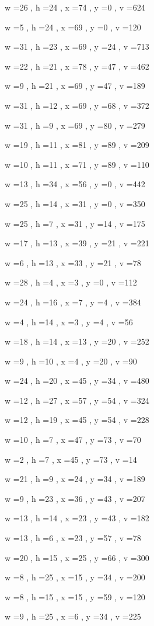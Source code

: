 \documentclass[11pt]{article}
\begin{document}
w =26 , h =24 , x =74 , y =0 , v =624
\par
w =5 , h =24 , x =69 , y =0 , v =120
\par
w =31 , h =23 , x =69 , y =24 , v =713
\par
w =22 , h =21 , x =78 , y =47 , v =462
\par
w =9 , h =21 , x =69 , y =47 , v =189
\par
w =31 , h =12 , x =69 , y =68 , v =372
\par
w =31 , h =9 , x =69 , y =80 , v =279
\par
w =19 , h =11 , x =81 , y =89 , v =209
\par
w =10 , h =11 , x =71 , y =89 , v =110
\par
w =13 , h =34 , x =56 , y =0 , v =442
\par
w =25 , h =14 , x =31 , y =0 , v =350
\par
w =25 , h =7 , x =31 , y =14 , v =175
\par
w =17 , h =13 , x =39 , y =21 , v =221
\par
w =6 , h =13 , x =33 , y =21 , v =78
\par
w =28 , h =4 , x =3 , y =0 , v =112
\par
w =24 , h =16 , x =7 , y =4 , v =384
\par
w =4 , h =14 , x =3 , y =4 , v =56
\par
w =18 , h =14 , x =13 , y =20 , v =252
\par
w =9 , h =10 , x =4 , y =20 , v =90
\par
w =24 , h =20 , x =45 , y =34 , v =480
\par
w =12 , h =27 , x =57 , y =54 , v =324
\par
w =12 , h =19 , x =45 , y =54 , v =228
\par
w =10 , h =7 , x =47 , y =73 , v =70
\par
w =2 , h =7 , x =45 , y =73 , v =14
\par
w =21 , h =9 , x =24 , y =34 , v =189
\par
w =9 , h =23 , x =36 , y =43 , v =207
\par
w =13 , h =14 , x =23 , y =43 , v =182
\par
w =13 , h =6 , x =23 , y =57 , v =78
\par
w =20 , h =15 , x =25 , y =66 , v =300
\par
w =8 , h =25 , x =15 , y =34 , v =200
\par
w =8 , h =15 , x =15 , y =59 , v =120
\par
w =9 , h =25 , x =6 , y =34 , v =225
\end{document}
